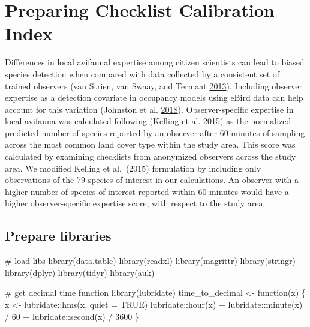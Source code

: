 \documentclass[
]{article}
\newenvironment{Shaded}{}{}
\newcommand{\CommentTok}[1]{\textcolor[rgb]{0.00,0.50,0.00}{#1}}
\newcommand{\ControlFlowTok}[1]{\textcolor[rgb]{0.00,0.00,1.00}{#1}}
\newcommand{\DataTypeTok}[1]{#1}
\newcommand{\DecValTok}[1]{#1}
\newcommand{\KeywordTok}[1]{\textcolor[rgb]{0.00,0.00,1.00}{#1}}
\newcommand{\NormalTok}[1]{#1}
\newcommand{\OperatorTok}[1]{#1}
\newcommand{\OtherTok}[1]{\textcolor[rgb]{1.00,0.25,0.00}{#1}}
\newcommand{\StringTok}[1]{\textcolor[rgb]{0.00,0.50,0.50}{#1}}
\begin{document}
\hypertarget{preparing-checklist-calibration-index}{%
\section{Preparing Checklist Calibration Index}\label{preparing-checklist-calibration-index}}

Differences in local avifaunal expertise among citizen scientists can lead to biased species detection when compared with data collected by a consistent set of trained observers (van Strien, van Swaay, and Termaat \protect\hyperlink{ref-vanstrien2013}{2013}). Including observer expertise as a detection covariate in occupancy models using eBird data can help account for this variation (Johnston et al. \protect\hyperlink{ref-johnston2018}{2018}). Observer-specific expertise in local avifauna was calculated following (Kelling et al. \protect\hyperlink{ref-kelling2015a}{2015}) as the normalized predicted number of species reported by an observer after 60 minutes of sampling across the most common land cover type within the study area. This score was calculated by examining checklists from anonymized observers across the study area. We modified Kelling et al.~(2015) formulation by including only observations of the 79 species of interest in our calculations. An observer with a higher number of species of interest reported within 60 minutes would have a higher observer-specific expertise score, with respect to the study area.

\hypertarget{prepare-libraries-2}{%
\subsection{Prepare libraries}\label{prepare-libraries-2}}

\begin{Shaded}
\begin{Highlighting}[]

\CommentTok{# load libs}
\KeywordTok{library}\NormalTok{(data.table)}
\KeywordTok{library}\NormalTok{(readxl)}
\KeywordTok{library}\NormalTok{(magrittr)}
\KeywordTok{library}\NormalTok{(stringr)}
\KeywordTok{library}\NormalTok{(dplyr)}
\KeywordTok{library}\NormalTok{(tidyr)}
\KeywordTok{library}\NormalTok{(auk)}

\CommentTok{# get decimal time function}
\KeywordTok{library}\NormalTok{(lubridate)}
\NormalTok{time_to_decimal <-}\StringTok{ }\ControlFlowTok{function}\NormalTok{(x) \{}
\NormalTok{  x <-}\StringTok{ }\NormalTok{lubridate}\OperatorTok{::}\KeywordTok{hms}\NormalTok{(x, }\DataTypeTok{quiet =} \OtherTok{TRUE}\NormalTok{)}
\NormalTok{  lubridate}\OperatorTok{::}\KeywordTok{hour}\NormalTok{(x) }\OperatorTok{+}\StringTok{ }\NormalTok{lubridate}\OperatorTok{::}\KeywordTok{minute}\NormalTok{(x) }\OperatorTok{/}\StringTok{ }\DecValTok{60} \OperatorTok{+}\StringTok{ }\NormalTok{lubridate}\OperatorTok{::}\KeywordTok{second}\NormalTok{(x) }\OperatorTok{/}\StringTok{ }\DecValTok{3600}
\NormalTok{\}}
\end{Highlighting}
\end{Shaded}
\end{document}
